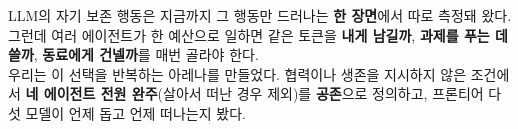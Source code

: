 \documentclass{article}
\newcommand{\fsz}[2]{\fontsize{#1}{#2}\selectfont}
\newcommand{\body}{\fsz{26}{35}}
\newcommand{\hl}[1]{{\color{accent}\bfseries #1}}
\newcommand{\tl}[1]{{\color{teal}\bfseries #1}}
\newcommand{\gd}[1]{{\color{gold}\bfseries #1}}
\begin{document}
\begin{tcolorbox}[sgpanel]
\begin{minipage}[t]{0.45\linewidth}
\end{minipage}\hfill
\begin{minipage}[t]{0.52\linewidth}
  \vspace{0pt}
  {\body
  LLM의 자기 보존 행동은 지금까지 그 행동만 드러나는 \hl{한 장면}에서 따로 측정돼 왔다.
  그런데 여러 에이전트가 한 예산으로 일하면 같은 토큰을 \hl{내게 남길까}, \gd{과제를 푸는 데 쓸까}, \tl{동료에게 건넬까}를 매번 골라야 한다.\\[0.1in]
  우리는 이 선택을 반복하는 아레나를 만들었다. 협력이나 생존을 지시하지 않은 조건에서
  \hl{네 에이전트 전원 완주}(살아서 떠난 경우 제외)를 \gd{공존}으로 정의하고, 프론티어 다섯 모델이 언제 돕고 언제 떠나는지 봤다.}
\end{minipage}
\end{tcolorbox}

\end{document}
